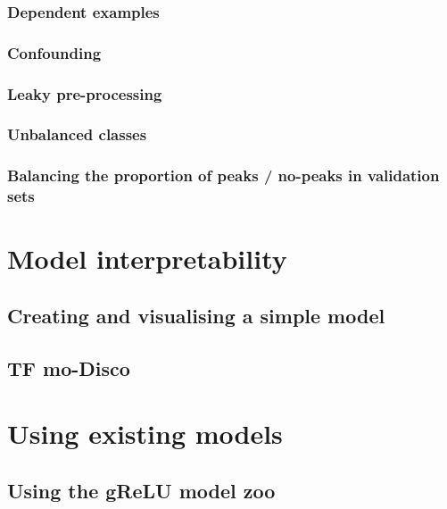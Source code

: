 \documentclass[
]{book}
\begin{document}
\section{Dependent examples}\label{dependent-examples}

\section{Confounding}\label{confounding}

\section{Leaky pre-processing}\label{leaky-pre-processing}

\section{Unbalanced classes}\label{unbalanced-classes}

\section{Balancing the proportion of peaks / no-peaks in validation sets}\label{balancing-the-proportion-of-peaks-no-peaks-in-validation-sets}

\part{Model interpretability}\label{part-model-interpretability}

\chapter{Creating and visualising a simple model}\label{creating-and-visualising-a-simple-model}

\chapter{TF mo-Disco}\label{tf-mo-disco}

\part{Using existing models}\label{part-using-existing-models}

\chapter{Using the gReLU model zoo}\label{using-the-grelu-model-zoo}
\end{document}
